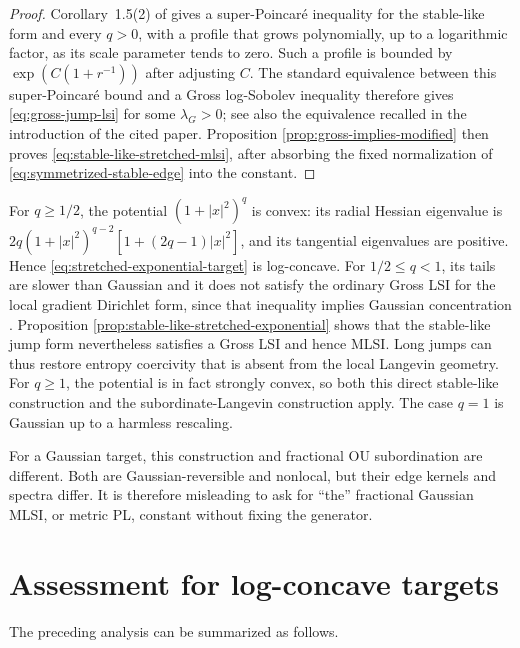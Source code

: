 \documentclass[11pt]{article}
\theoremstyle{definition}
\newcommand{\abs}[1]{\left\lvert #1\right\rvert}
\begin{document}
\begin{proof}
Corollary~1.5(2) of \citet{WangWang2015StableLike} gives a
super-Poincar\'e inequality for the stable-like form and every $q>0$, with a
profile that grows polynomially, up to a logarithmic factor, as its scale
parameter tends to zero.  Such a profile is bounded by
$\exp(C(1+r^{-1}))$ after adjusting $C$.  The standard equivalence between
this super-Poincar\'e bound and a Gross log-Sobolev inequality therefore gives
\eqref{eq:gross-jump-lsi} for some $\lambda_G>0$; see also the equivalence
recalled in the introduction of the cited paper.  Proposition
\ref{prop:gross-implies-modified} then proves
\eqref{eq:stable-like-stretched-mlsi}, after absorbing the fixed normalization
of \eqref{eq:symmetrized-stable-edge} into the constant.
\end{proof}

For $q\geq1/2$, the potential $(1+\abs x^2)^q$ is convex: its radial Hessian
eigenvalue is
$2q(1+\abs x^2)^{q-2}[1+(2q-1)\abs x^2]$, and its tangential eigenvalues are
positive.  Hence \eqref{eq:stretched-exponential-target} is log-concave.  For
$1/2\leq q<1$, its tails are slower than Gaussian and it does not satisfy the
ordinary Gross LSI for the local gradient Dirichlet form, since that
inequality implies Gaussian concentration \citep{BakryGentilLedoux2014}.
Proposition
\ref{prop:stable-like-stretched-exponential} shows that the stable-like jump
form nevertheless satisfies a Gross LSI and hence MLSI.  Long jumps can thus
restore entropy coercivity that is absent from the local Langevin geometry.
For $q\geq1$, the potential is in fact strongly convex, so both this direct
stable-like construction and the subordinate-Langevin construction apply.
The case $q=1$ is Gaussian up to a harmless rescaling.

For a Gaussian target, this construction and fractional OU subordination are
different.  Both are Gaussian-reversible and nonlocal, but their edge kernels
and spectra differ.  It is therefore misleading to ask for ``the''
fractional Gaussian MLSI, or metric PL, constant without fixing the generator.

\section{Assessment for log-concave targets}

The preceding analysis can be summarized as follows.
\end{document}
